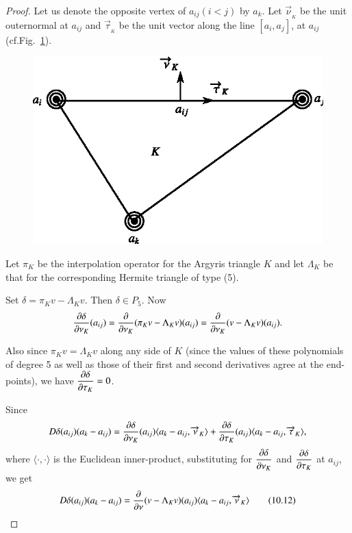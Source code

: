 \begin{proof}
Let us denote the opposite vertex of $a_{ij}(i<j)$ by $a_{k}$. Let
$\overrightarrow{\nu}_{_{K}}$ be the unit outernormal at $a_{ij}$ and
$\overrightarrow{\tau}_{_{K}}$ be the unit vector along the line
$[a_{i},a_{j}]$, at $a_{ij}$ (cf.\@ Fig.~\ref{chap10-fig10.5}). 
\begin{figure}[H]
\centering
\includegraphics{figure/fig10.5.eps}
\caption{}\label{chap10-fig10.5}
\end{figure}

Let $\pi_{K}$ be the interpolation operator for the Argyris triangle
$K$ and let $\Lambda_{K}$ be that for the corresponding Hermite
triangle of type (5).

Set $\delta=\pi_{K}v-\Lambda_{K}v$. Then $\delta\in P_{5}$. Now
$$
\frac{\partial \delta}{\partial \nu_{K}}(a_{ij})=\frac{\partial}{\partial
  \nu_{K}}(\pi_{K}v-\Lambda_{K}v)(a_{ij})=\frac{\partial}{\partial
  \nu_{K}}(v-\Lambda_{K}v)(a_{ij}). 
$$

Also since $\pi_{K}v=\Lambda_{K}v$ along any side of $K$ (since the
values of these polynomials of degree 5 as well as those of their
first and second derivatives agree at the end-points), we have
$\dfrac{\partial \delta}{\partial \tau_{K}}=0$.

Since
$$
D\delta (a_{ij})(a_{k}-a_{ij})=\frac{\partial \delta}{\partial
  \nu_{K}}(a_{ij})\langle a_{k}-a_{ij},\overrightarrow{\nu}_{K}\rangle+\frac{\partial
  \delta}{\partial \tau_{K}}(a_{ij})\langle
a_{k}-a_{ij},\overrightarrow{\tau}_{K}\rangle, 
$$
where $\langle \cdot,\cdot\rangle$ is the Euclidean inner-product,
substituting for $\dfrac{\partial \delta}{\partial \nu_{K}}$ and $\dfrac{\partial
  \delta}{\partial \tau_{K}}$ at $a_{ij}$, we get
\begin{equation*}
D\delta (a_{ij})(a_{k}-a_{ij})=\frac{\partial}{\partial
  \nu}(v-\Lambda_{K}v)(a_{ij})\langle
a_{k}-a_{ij},\overrightarrow{\nu}_{K}\rangle\tag{10.12}\label{chap10-eq10.12} 
\end{equation*}


\end{proof}

